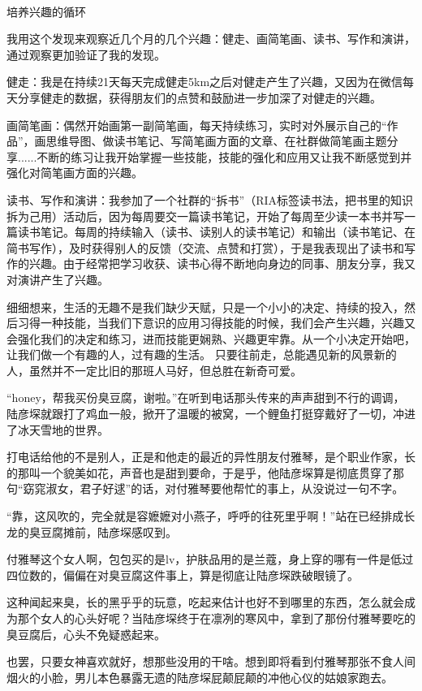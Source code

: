 \documentclass[11pt,a4paper]{article}
\begin{document}
﻿

培养兴趣的循环

我用这个发现来观察近几个月的几个兴趣：健走、画简笔画、读书、写作和演讲，通过观察更加验证了我的发现。﻿﻿

健走：我是在持续21天每天完成健走5km之后对健走产生了兴趣，又因为在微信每天分享健走的数据，获得朋友们的点赞和鼓励进一步加深了对健走的兴趣。﻿﻿

画简笔画：偶然开始画第一副简笔画，每天持续练习，实时对外展示自己的“作品”，画思维导图、做读书笔记、写简笔画方面的文章、在社群做简笔画主题分享......不断的练习让我开始掌握一些技能，技能的强化和应用又让我不断感觉到并强化对简笔画方面的兴趣。﻿﻿

读书、写作和演讲：我参加了一个社群的“拆书”（RIA标签读书法，把书里的知识拆为己用）活动后，因为每周要交一篇读书笔记，开始了每周至少读一本书并写一篇读书笔记。每周的持续输入（读书、读别人的读书笔记）和输出（读书笔记、在简书写作），及时获得别人的反馈（交流、点赞和打赏），于是我表现出了读书和写作的兴趣。由于经常把学习收获、读书心得不断地向身边的同事、朋友分享，我又对演讲产生了兴趣。﻿﻿﻿﻿﻿﻿﻿﻿﻿

细细想来，生活的无趣不是我们缺少天赋，只是一个小小的决定、持续的投入，然后习得一种技能，当我们下意识的应用习得技能的时候，我们会产生兴趣，兴趣又会强化我们的决定和练习，进而技能更娴熟、兴趣更牢靠。从一个小决定开始吧，让我们做一个有趣的人，过有趣的生活。
只要往前走，总能遇见新的风景新的人，虽然并不一定比旧的那班人马好，但总胜在新奇可爱。﻿﻿

“honey，帮我买份臭豆腐，谢啦。”在听到电话那头传来的声声甜到不行的调调，陆彦堔就跟打了鸡血一般，掀开了温暖的被窝，一个鲤鱼打挺穿戴好了一切，冲进了冰天雪地的世界。﻿﻿

打电话给他的不是别人，正是和他走的最近的异性朋友付雅琴，是个职业作家，长的那叫一个貌美如花，声音也是甜到要命，于是乎，他陆彦堔算是彻底贯穿了那句“窈窕淑女，君子好逑”的话，对付雅琴要他帮忙的事上，从没说过一句不字。﻿﻿

“靠，这风吹的，完全就是容嬷嬷对小燕子，呼呼的往死里乎啊！”站在已经排成长龙的臭豆腐摊前，陆彦堔感叹到。﻿﻿

付雅琴这个女人啊，包包买的是lv，护肤品用的是兰蔻，身上穿的哪有一件是低过四位数的，偏偏在对臭豆腐这件事上，算是彻底让陆彦堔跌破眼镜了。﻿﻿

这种闻起来臭，长的黑乎乎的玩意，吃起来估计也好不到哪里的东西，怎么就会成为那个女人的心头好呢？当陆彦堔终于在凛冽的寒风中，拿到了那份付雅琴要吃的臭豆腐后，心头不免疑惑起来。﻿﻿

也罢，只要女神喜欢就好，想那些没用的干啥。想到即将看到付雅琴那张不食人间烟火的小脸，男儿本色暴露无遗的陆彦堔屁颠屁颠的冲他心仪的姑娘家跑去。﻿﻿﻿
\end{document}
